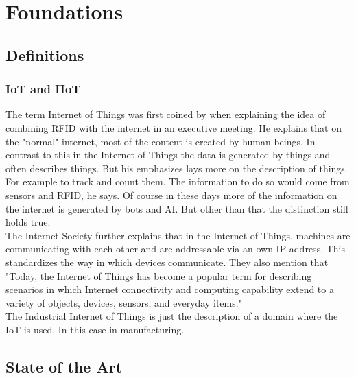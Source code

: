 \clearpage
\chapter{\textbf{Foundations}}\label{grundlagen}
\section{Definitions}
\subsection{IoT and IIoT}
The term Internet of Things was first coined by \cite{ashtonThatInternetThings} when explaining the idea of combining RFID with the internet in an executive meeting. He explains that on the "normal" internet, most of the content is created by human beings. In contrast to this in the Internet of Things the data is generated by things and often describes things. But his emphasizes lays more on the description of things. For example to track and count them. The information to do so would come from sensors and RFID, he says.
Of course in these days more of the information on the internet is generated by bots and AI. But other than that the distinction still holds true. 
\\The Internet Society \cite{roseInternetThingsOverview} further explains that in the Internet of Things, machines are communicating with each other and are addressable via an own IP address. This standardizes the way in which devices communicate. They also mention that "Today, the Internet of Things has become a popular term for describing scenarios in which  Internet connectivity and computing capability extend to a variety of objects, devices, sensors, and everyday  items."
\\The Industrial Internet of Things is just the description of a domain where the IoT is used. In this case in manufacturing. \cite{WhatIoTInternet}
\section{State of the Art}\label{unterkapitel}
